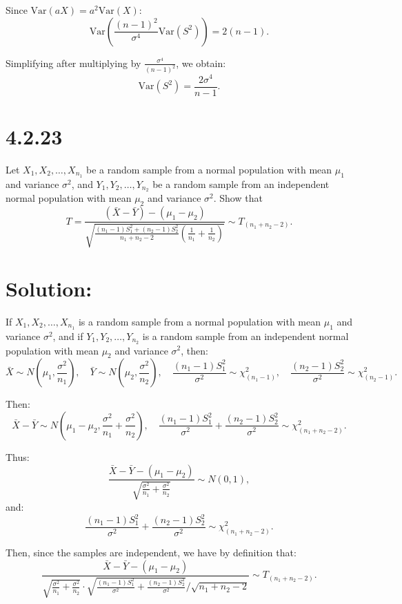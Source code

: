 \documentclass{article}
\begin{document}
Since $\text{Var}(aX) = a^2\text{Var}(X)$:
\[
\text{Var} \left( \frac{(n-1)^2}{\sigma^4} \text{Var}(S^2) \right) = 2(n-1).
\]

Simplifying after multiplying by $\frac{\sigma^4}{(n-1)^2}$, we obtain:
\[
\text{Var}(S^2) = \frac{2\sigma^4}{n-1}.
\]

\section*{4.2.23}

Let $X_1, X_2, \dots, X_{n_1}$ be a random sample from a normal population with mean $\mu_1$ and variance $\sigma^2$, and $Y_1, Y_2, \dots, Y_{n_2}$ be a random sample from an independent normal population with mean $\mu_2$ and variance $\sigma^2$. Show that
\[
T = \frac{\left(\bar{X} - \bar{Y}\right) - \left(\mu_1 - \mu_2\right)}{\sqrt{\frac{(n_1 - 1)S_1^2 + (n_2 - 1)S_2^2}{n_1 + n_2 - 2} \left(\frac{1}{n_1} + \frac{1}{n_2}\right)}} \sim T_{(n_1 + n_2 - 2)}.
\]

\section*{Solution:}

If $X_1, X_2, \dots, X_{n_1}$ is a random sample from a normal population with mean $\mu_1$ and variance $\sigma^2$, and if $Y_1, Y_2, \dots, Y_{n_2}$ is a random sample from an independent normal population with mean $\mu_2$ and variance $\sigma^2$, then:
\[
\bar{X} \sim N\left(\mu_1, \frac{\sigma^2}{n_1}\right), \quad \bar{Y} \sim N\left(\mu_2, \frac{\sigma^2}{n_2}\right), \quad \frac{(n_1 - 1)S_1^2}{\sigma^2} \sim \chi^2_{(n_1 - 1)}, \quad \frac{(n_2 - 1)S_2^2}{\sigma^2} \sim \chi^2_{(n_2 - 1)}.
\]

Then:
\[
\bar{X} - \bar{Y} \sim N\left(\mu_1 - \mu_2, \frac{\sigma^2}{n_1} + \frac{\sigma^2}{n_2}\right), \quad \frac{(n_1 - 1)S_1^2}{\sigma^2} + \frac{(n_2 - 1)S_2^2}{\sigma^2} \sim \chi^2_{(n_1 + n_2 - 2)}.
\]

Thus:
\[
\frac{\bar{X} - \bar{Y} - (\mu_1 - \mu_2)}{\sqrt{\frac{\sigma^2}{n_1} + \frac{\sigma^2}{n_2}}} \sim N(0, 1),
\]
and:
\[
\frac{(n_1 - 1)S_1^2}{\sigma^2} + \frac{(n_2 - 1)S_2^2}{\sigma^2} \sim \chi^2_{(n_1 + n_2 - 2)}.
\]

Then, since the samples are independent, we have by definition that:
\[
\frac{\bar{X} - \bar{Y} - (\mu_1 - \mu_2)}{\sqrt{\frac{\sigma^2}{n_1} + \frac{\sigma^2}{n_2}} \cdot \sqrt{\frac{(n_1 - 1)S_1^2}{\sigma^2} + \frac{(n_2 - 1)S_2^2}{\sigma^2}} \Big/ \sqrt{n_1 + n_2 - 2}} \sim T_{(n_1 + n_2 - 2)}.
\]
\end{document}
